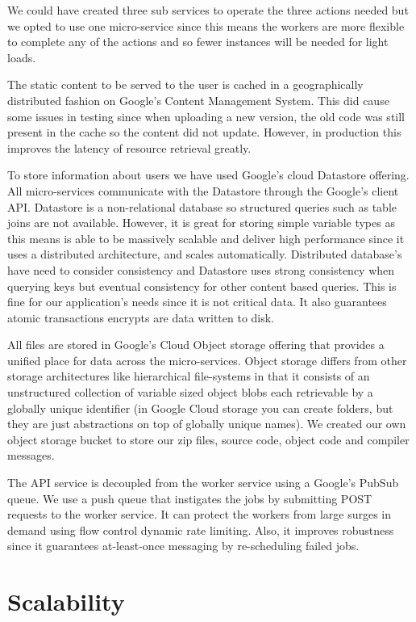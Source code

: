 \documentclass[conference]{IEEEtran}
\begin{document}
We could have created three
sub services to operate the three actions needed but we opted to use one micro-service since this means the workers are more flexible to complete any of the actions and so fewer instances will be needed for light loads.

The static content to be served to the user is cached in a geographically distributed fashion on Google's Content Management System. This did cause some issues in testing since when uploading a new version, the old code was still present in the cache so the content did not update. However, in production this improves the latency of resource retrieval greatly.

To store information about users we have used Google's cloud Datastore offering. All micro-services communicate with the Datastore through the Google's client API. Datastore is a non-relational database so structured queries such as table joins are not available. However, it is great for storing simple variable types as this means is able to be massively scalable and deliver high performance since it uses a distributed architecture, and scales automatically. Distributed database's have need to consider consistency and Datastore uses strong consistency when querying keys but eventual consistency for other content based queries. This is fine for our application's needs since it is not critical data. It also guarantees atomic transactions encrypts are data written to disk.

All files are stored in Google's Cloud Object storage offering that provides a unified place for data across the micro-services. Object storage differs from other storage architectures like hierarchical file-systems in that it consists of an unstructured collection of variable sized object blobs each retrievable by a globally unique identifier (in Google Cloud storage you can create folders, but they are just abstractions on top of globally unique names). We created our own object storage bucket to store our zip files, source code, object code and compiler messages. 

The API service is decoupled from the worker service using a Google's PubSub queue. We use a push queue that instigates the jobs by submitting POST requests to the worker service. It can protect the workers from large surges in demand using flow control dynamic rate limiting. Also, it improves robustness since it guarantees at-least-once messaging by re-scheduling failed jobs.

\section{Scalability}
\end{document}
